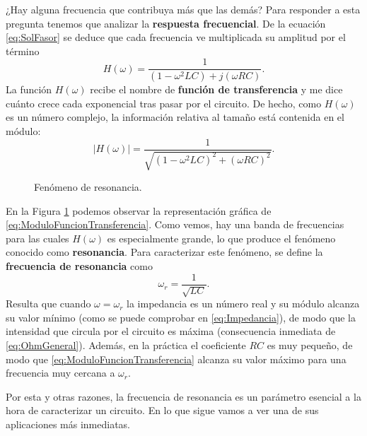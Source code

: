 ¿Hay alguna frecuencia que contribuya más que las demás? Para responder a esta pregunta tenemos que analizar la \textbf{respuesta frecuencial}. De la ecuación \eqref{eq:SolFasor} se deduce que cada frecuencia ve multiplicada su amplitud por el término
\begin{equation}
  \label{eq:FuncionTransferencia}
  H(\omega) = \frac{1}{(1-\omega^2 LC) + j(\omega RC)}.
\end{equation}
La función $H(\omega)$ recibe el nombre de \textbf{función de transferencia} y me dice cuánto crece cada exponencial tras pasar por el circuito. De hecho, como $H(\omega)$ es un número complejo, la información relativa al tamaño está contenida en el módulo:
\begin{equation}
  \label{eq:ModuloFuncionTransferencia}
  \left|H(\omega)\right| = \frac{1}{\sqrt{(1-\omega^2 LC)^2 + (\omega RC)^2}}.
\end{equation}

\begin{figure}
\begin{figurebox}
    \vspace{5pt}
    \centering
    \scalebox{0.4}{ }
    \vspace{-10pt}
    \caption{Fenómeno de resonancia.}
    \label{fig:Resonancia}
\end{figurebox}
\end{figure}


En la Figura \ref{fig:Resonancia} podemos observar la representación gráfica de \eqref{eq:ModuloFuncionTransferencia}. Como vemos, hay una banda de frecuencias para las cuales $H(\omega)$ es especialmente grande, lo que produce el fenómeno conocido como \textbf{resonancia}. Para caracterizar este fenómeno, se define la \textbf{frecuencia de resonancia} como
\begin{equation}
  \label{eq:FrecuenciaNatural}
  \omega_r = \frac{1}{\sqrt{LC}}.
\end{equation}
Resulta que cuando $\omega=\omega_r$ la impedancia es un número real y su módulo alcanza su valor mínimo (como se puede comprobar en \eqref{eq:Impedancia}), de modo que la intensidad que circula por el circuito es máxima (consecuencia inmediata de \eqref{eq:OhmGeneral}). Además, en la práctica el coeficiente $RC$ es muy pequeño, de modo que \eqref{eq:ModuloFuncionTransferencia} alcanza su valor máximo para una frecuencia muy cercana a $\omega_r$.

Por esta y otras razones, la frecuencia de resonancia es un parámetro esencial a la hora de caracterizar un circuito. En lo que sigue vamos a ver una de sus aplicaciones más inmediatas.




